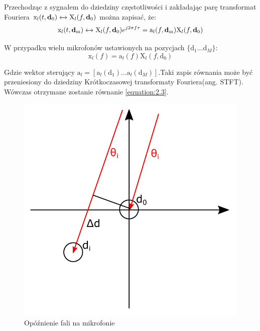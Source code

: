 \noindent Przechodząc z sygnałem do dziedziny częstotliwości i zakładając parę transformat Fouriera $\mathrm{x}_{l}(t,\bm{\mathrm{d}}_{0})\xleftrightarrow{}\mathrm{X}_{l}(f,\bm{\mathrm{d}}_{0})$ można zapisać, że:
\begin{equation}
    \label{equation:2.6}
    \mathrm{x}_{l}(t,\bm{\mathrm{d}}_{\mathrm{m}}) \xleftrightarrow{} \mathrm{X}_{l}(f,\bm{\mathrm{d}}_{0})e^{j 2 \pi f \tau} =
    \mathrm{a}_{l}(f,\bm{\mathrm{d}}_{\mathrm{m}}) \mathrm{X}_{l}(f,\bm{\mathrm{d}}_{0}) 
\end{equation}

\noindent W przypadku wielu mikrofonów ustawionych na pozycjach $\{\bm{\mathrm{d}}_{1}...\bm{\mathrm{d}}_{M} \}$:
\begin{equation}
    \label{equation:2.7}
    \bm{\mathrm{x}}_l(f)=
    \bm{\mathrm{a}}_l(f)\mathrm{X}_{l}(f,\bm{\mathrm{d}}_{0})
\end{equation}

\noindent Gdzie wektor sterujący $\bm{\mathrm{a}}_{l} = [\mathrm{a}_{l}(\bm{\mathrm{d}}_{1})...\mathrm{a}_{l}(\bm{\mathrm{d}}_{M})]$.Taki zapis równania może być przeniesiony do dziedziny Krótkoczasowej transformaty Fouriera(ang. STFT). Wówczas otrzymane zostanie równanie \eqref{equation:2.3}.

\begin{figure}[h]
    \centering
    \includegraphics[width=\textwidth]{Images/direction.png}
    \caption{Opóźnienie fali na mikrofonie}
    \label{fig:direction}
\end{figure}

